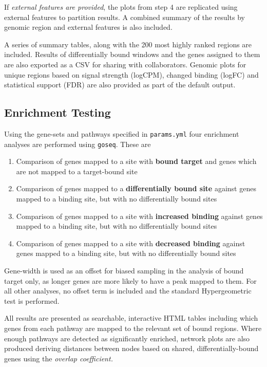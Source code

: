 \documentclass[
]{book}
\providecommand{\tightlist}{%
  \setlength{\itemsep}{0pt}\setlength{\parskip}{0pt}}
\begin{document}
If \emph{external features are provided}, the plots from step 4 are replicated using external features to partition results.
A combined summary of the results by genomic region and external features is also included.

A series of summary tables, along with the 200 most highly ranked regions are included.
Results of differentially bound windows and the genes assigned to them are also exported as a CSV for sharing with collaborators.
Genomic plots for unique regions based on signal strength (logCPM), changed binding (logFC) and statistical support (FDR) are also provided as part of the default output.

\hypertarget{enrichment-testing}{%
\subsection*{Enrichment Testing}\label{enrichment-testing}}

Using the gene-sets and pathways specified in \texttt{params.yml} four enrichment analyses are performed using \texttt{goseq}\citep{goseq}.
These are

\begin{enumerate}
\def\labelenumi{\arabic{enumi}.}
\tightlist
\item
  Comparison of genes mapped to a site with \textbf{bound target} and genes which are not mapped to a target-bound site
\item
  Comparison of genes mapped to a \textbf{differentially bound site} against genes mapped to a binding site, but with no differentially bound sites
\item
  Comparison of genes mapped to a site with \textbf{increased binding} against genes mapped to a binding site, but with no differentially bound sites
\item
  Comparison of genes mapped to a site with \textbf{decreased binding} against genes mapped to a binding site, but with no differentially bound sites
\end{enumerate}

Gene-width is used as an offset for biased sampling in the analysis of bound target only, as longer genes are more likely to have a peak mapped to them.
For all other analyses, no offset term is included and the standard Hypergeometric test is performed.

All results are presented as searchable, interactive HTML tables including which genes from each pathway are mapped to the relevant set of bound regions.
Where enough pathways are detected as significantly enriched, network plots are also produced deriving distances between nodes based on shared, differentially-bound genes using the \emph{overlap coefficient.}
\end{document}
